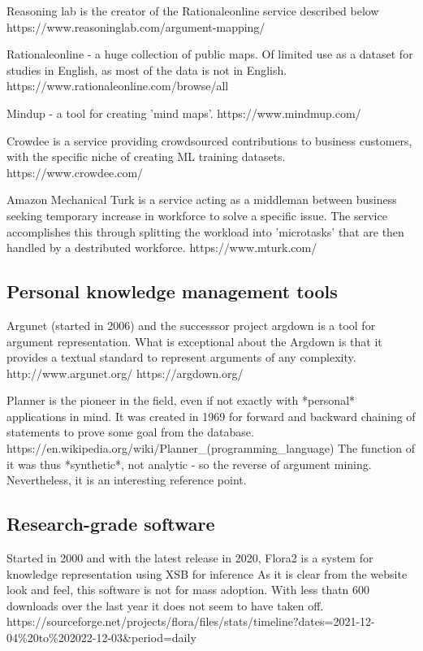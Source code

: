 \documentclass{article}
\begin{document}
Reasoning lab is the creator of the Rationaleonline service described below
https://www.reasoninglab.com/argument-mapping/

Rationaleonline - a huge collection of public maps. Of limited use as a dataset for studies in English, as most of the data is not in English.
https://www.rationaleonline.com/browse/all

Mindup - a tool for creating 'mind maps'.
https://www.mindmup.com/

Crowdee is a service providing crowdsourced contributions to business customers, with the specific niche of creating ML training datasets.
https://www.crowdee.com/

Amazon Mechanical Turk is a service acting as a middleman between business seeking temporary increase in workforce to solve a specific issue.
The service accomplishes this through splitting the workload into 'microtasks' that are then handled by a destributed workforce.
https://www.mturk.com/


\subsection{Personal knowledge management tools}
Argunet (started in 2006) and the successsor project argdown is a tool for argument representation.
What is exceptional about the Argdown is that it provides a textual standard to represent arguments of any complexity.
http://www.argunet.org/
https://argdown.org/

Planner is the pioneer in the field, even if not exactly with *personal* applications in mind.
It was created in 1969 for forward and backward chaining of statements to prove some goal from the database.
https://en.wikipedia.org/wiki/Planner_(programming_language)
The function of it was thus *synthetic*, not analytic - so the reverse of argument mining. 
Nevertheless, it is an interesting reference point.

\subsection{Research-grade software}

Started in 2000 and with the latest release in 2020, Flora2 is a system for knowledge representation using XSB for inference
As it is clear from the website look and feel, this software is not for mass adoption.
With less thatn 600 downloads over the last year it does not seem to have taken off.
https://sourceforge.net/projects/flora/files/stats/timeline?dates=2021-12-04\%20to\%202022-12-03&period=daily
\end{document}
